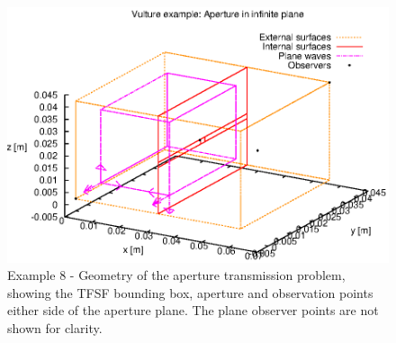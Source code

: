 \documentclass[onecolumn,a4paper]{article}
\numberwithin{equation}{section}
\begin{document}
\begin{figure}[ht]
 \centerline{\includegraphics[width=0.80\linewidth]{figures/aperture-mesh}}
 \caption{\label{fg:aperture-mesh} Example 8 - Geometry of the aperture transmission problem, showing
 the TFSF bounding box, aperture and observation points either side of the aperture plane. The plane observer
 points are not shown for clarity.}
\end{figure}
\end{document}
